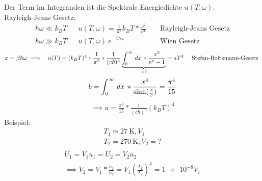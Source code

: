 %
Der Term im Integranden ist die Spektrale Energiedichte $u(T, \omega)$. \\
Rayleigh-Jeans Gesetz:
%
\begin{align*}
  \hbar \omega \ll  k_B T && u(T, \omega) = \frac{1}{\pi^2} k_B T * \frac{\omega^2}{c^3} && \text{ Rayleigh-Jeans Gesetz} \\
  \hbar \omega \gg  k_B T && u(T, \omega) ~ e^{-\beta \hbar \omega} && \text{ Wien Gesetz}
\end{align*}
%
%
\begin{align*}
  x = \beta \hbar \omega \implies  && u(T) = (k_B T)^4 * \frac{1}{\pi^2} * \frac{1}{(c \hbar)^3}
  \underbrace{\int_{0}^{\infty} \,dx\, * \frac{x^3}{e^x - 1}}_{= b} = a T^4 && \text{ Stefan-Boltzmann-Gesetz }
\end{align*}
%
%
\begin{align*}
  b = \int_{0}^{\infty} \,dx\, * \frac{x^4}{\sinh(\frac{x}{2})} = \frac{\pi^4}{15}
\end{align*}
%
%
\begin{align*}
  \implies u = \frac{\pi^2}{15} * \frac{1}{(c \hbar)^3} (k_B T)^4
\end{align*}
%
Beispiel:
%
\begin{align*}
  T_1 \simeq \SI{27}{\kelvin}, V_1 \\
  T_2 = \SI{270}{\kelvin}, V_2 = ? \\
\end{align*}
%
%
\begin{align*}
  U_1 = V_1 u_1 = U_2 = V_2 u_2 \\
  \implies V_2 = V_1 * \frac{u_1}{u_2} = V_1 \left( \frac{T_1}{T_2} \right)^4 = 
  \num{1e-8} V_1
\end{align*}
%



















